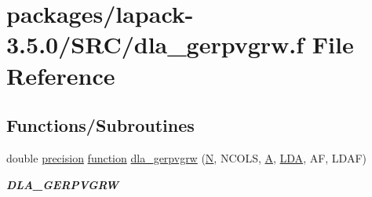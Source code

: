 \hypertarget{dla__gerpvgrw_8f}{}\section{packages/lapack-\/3.5.0/\+S\+R\+C/dla\+\_\+gerpvgrw.f File Reference}
\label{dla__gerpvgrw_8f}
\subsection*{Functions/\+Subroutines}
\begin{DoxyCompactItemize}
\item 
double \hyperlink{numinquire_8h_a2c8e616467665d0b2814d4c1589ba74e}{precision} \hyperlink{afunc_8m_a7b5e596df91eadea6c537c0825e894a7}{function} \hyperlink{group__doubleGEcomputational_gae1378019437b04b2b46b5f7be3b5e175}{dla\+\_\+gerpvgrw} (\hyperlink{polmisc_8c_a0240ac851181b84ac374872dc5434ee4}{N}, N\+C\+O\+L\+S, \hyperlink{classA}{A}, \hyperlink{example__user_8c_ae946da542ce0db94dced19b2ecefd1aa}{L\+D\+A}, A\+F, L\+D\+A\+F)
\begin{DoxyCompactList}\small\item\em {\bfseries D\+L\+A\+\_\+\+G\+E\+R\+P\+V\+G\+R\+W} \end{DoxyCompactList}\end{DoxyCompactItemize}
